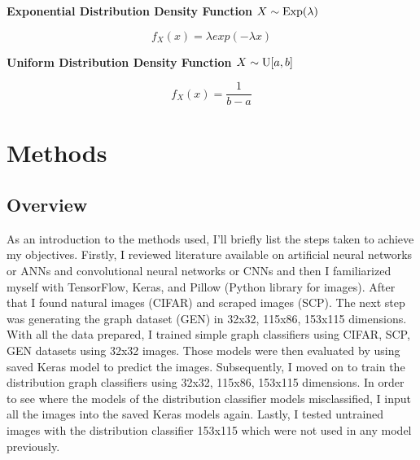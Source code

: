 \documentclass[12pt]{article}
\begin{document}
            \textbf{Exponential Distribution Density Function  $ X \sim \textnormal{Exp}(\lambda) $}

            \begin{Large} 

                \[ f_X(x) = \lambda exp(- \lambda x) \] 

            \end{Large}
            
            \textbf{Uniform Distribution Density Function  $ X \sim \textnormal{U}[a, b] $}
            
            \begin{Large} 

                \[ f_X(x) = \frac{1}{b - a} \] 

            \end{Large}

    \newpage \section{Methods}

        \subsection{Overview}

            As an introduction to the methods used, I’ll briefly list the steps taken to achieve my objectives. 
            Firstly, I reviewed literature available on artificial neural networks or ANNs and convolutional neural networks 
            or CNNs and then I familiarized myself with TensorFlow, Keras, and Pillow (Python library for images). 
            After that I found natural images (CIFAR) and scraped images (SCP). 
            The next step was generating the graph dataset (GEN) in 32x32, 115x86, 153x115 dimensions. 
            With all the data prepared, I trained simple graph classifiers using CIFAR, SCP, GEN datasets using 32x32 images. 
            Those models were then evaluated by using saved Keras model to predict the images. 
            Subsequently, I moved on to train the distribution graph classifiers using 32x32, 115x86, 153x115 dimensions. 
            In order to see where the models of the distribution classifier models misclassified, 
            I input all the images into the saved Keras models again. 
            Lastly, I tested untrained images with the distribution classifier 153x115 which were not used in any model previously.
        
\end{document}
